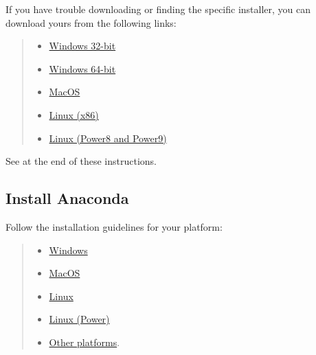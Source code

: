 \documentclass{latex-template/tufte-handout}
\begin{document}
If you have trouble downloading or finding the specific installer, you
can download yours from the following links:
\begin{quote}
	
\begin{itemize}
\item \href{https://repo.anaconda.com/archive/Anaconda3-2021.05-Windows-x86.exe}{Windows
  32-bit}\\
\item \href{https://repo.anaconda.com/archive/Anaconda3-2021.05-Windows-x86_64.exe}{Windows
  64-bit}\\
\item \href{https://repo.anaconda.com/archive/Anaconda3-2021.05-MacOSX-x86_64.pkg}{MacOS}\\
\item \href{https://repo.anaconda.com/archive/Anaconda3-2021.05-Linux-x86_64.sh}{Linux
  (x86)}\\
\item \href{https://repo.anaconda.com/archive/Anaconda3-2021.05-Linux-ppc64le.sh}{Linux
  (Power8 and Power9)}
\end{itemize}
\end{quote}

See  at the end of these instructions.

\subsection{Install Anaconda}\label{install-anaconda}

Follow the installation guidelines for your platform:

\begin{quote}
\begin{itemize}
\item \href{https://docs.anaconda.com/anaconda/install/windows/}{Windows}\\
\item \href{https://docs.anaconda.com/anaconda/install/mac-os/}{MacOS}
\item \href{https://docs.anaconda.com/anaconda/install/linux/}{Linux}\\
\item \href{https://docs.anaconda.com/anaconda/install/linux-power8/}{Linux (Power)}
\item \href{https://docs.anaconda.com/anaconda/install/}{Other platforms}.
\end{itemize}
\end{quote}
\end{document}
